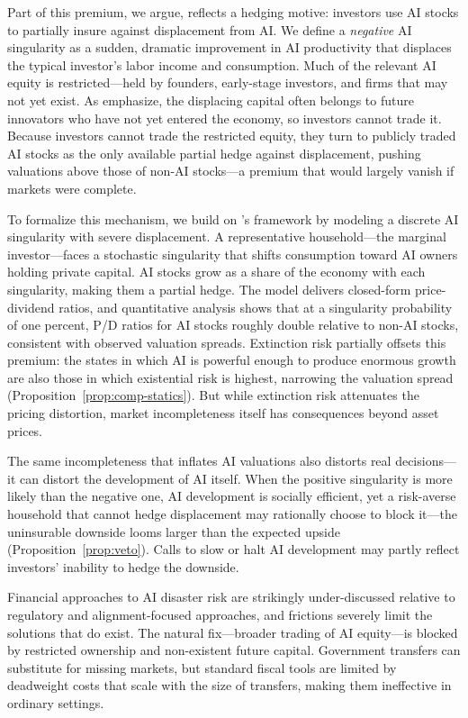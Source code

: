 \documentclass[12pt]{article}
\begin{document}
Part of this premium, we argue, reflects a hedging motive: investors use AI stocks to partially insure against displacement from AI. We define a \emph{negative} AI singularity as a sudden, dramatic improvement in AI productivity that displaces the typical investor's labor income and consumption. Much of the relevant AI equity is restricted---held by founders, early-stage investors, and firms that may not yet exist. As \citet{GKP2012} emphasize, the displacing capital often belongs to future innovators who have not yet entered the economy, so investors cannot trade it. Because investors cannot trade the restricted equity, they turn to publicly traded AI stocks as the only available partial hedge against displacement, pushing valuations above those of non-AI stocks---a premium that would largely vanish if markets were complete.

To formalize this mechanism, we build on \citet{GKP2012}'s framework by modeling a discrete AI singularity with severe displacement. A representative household---the marginal investor---faces a stochastic singularity that shifts consumption toward AI owners holding private capital. AI stocks grow as a share of the economy with each singularity, making them a partial hedge. The model delivers closed-form price-dividend ratios, and quantitative analysis shows that at a singularity probability of one percent, P/D ratios for AI stocks roughly double relative to non-AI stocks, consistent with observed valuation spreads. Extinction risk \citep{Jones2024} partially offsets this premium: the states in which AI is powerful enough to produce enormous growth are also those in which existential risk is highest, narrowing the valuation spread (Proposition~\ref{prop:comp-statics}). But while extinction risk attenuates the pricing distortion, market incompleteness itself has consequences beyond asset prices.

The same incompleteness that inflates AI valuations also distorts real decisions---it can distort the development of AI itself. When the positive singularity is more likely than the negative one, AI development is socially efficient, yet a risk-averse household that cannot hedge displacement may rationally choose to block it---the uninsurable downside looms larger than the expected upside (Proposition~\ref{prop:veto}). Calls to slow or halt AI development may partly reflect investors' inability to hedge the downside.

Financial approaches to AI disaster risk are strikingly under-discussed relative to regulatory and alignment-focused approaches, and frictions severely limit the solutions that do exist. The natural fix---broader trading of AI equity---is blocked by restricted ownership and non-existent future capital. Government transfers can substitute for missing markets, but standard fiscal tools are limited by deadweight costs that scale with the size of transfers, making them ineffective in ordinary settings.
\end{document}
